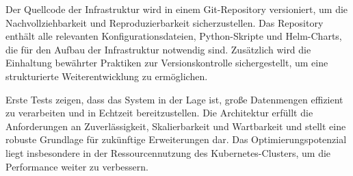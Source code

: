 \documentclass[%
pdftex,
oneside,			%
11pt,				%
parskip=half,		%
headheight = 12pt,	%
headsepline,		%
footsepline,		%
footheight = 16pt,	%
abstracton,		%
DIV=calc,		%
BCOR=8mm,		%
headinclude=false,	%
footinclude=false,	%
listof=totoc,		%
toc=bibliography,	%
]{scrreprt}	%
\begin{document}
    Der Quellcode der Infrastruktur wird in einem Git-Repository versioniert, um die Nachvollziehbarkeit und Reproduzierbarkeit sicherzustellen.
    Das Repository enthält alle relevanten Konfigurationsdateien, Python-Skripte und Helm-Charts, die für den Aufbau der Infrastruktur notwendig sind.
    Zusätzlich wird die Einhaltung bewährter Praktiken zur Versionskontrolle sichergestellt, um eine strukturierte Weiterentwicklung zu ermöglichen.

    Erste Tests zeigen, dass das System in der Lage ist, große Datenmengen effizient zu verarbeiten und in Echtzeit bereitzustellen.
    Die Architektur erfüllt die Anforderungen an Zuverlässigkeit, Skalierbarkeit und Wartbarkeit und stellt eine robuste Grundlage für zukünftige Erweiterungen dar.
    Das Optimierungspotenzial liegt insbesondere in der Ressourcennutzung des Kubernetes-Clusters, um die Performance weiter zu verbessern.



\ifx\VAlterZitierstil\VTrueValue
    \printbibliography
\else
    
    
\fi
\end{document}
